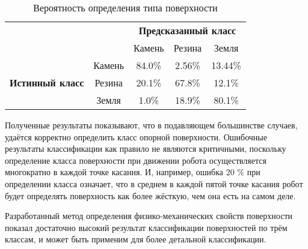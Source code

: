 \begin{table}[H]
    \caption{Вероятность определения типа поверхности}
    \label{tabular:prob_terrain_classification}
    \centering
\begin{tabular}{|c|c|c|c|c|} 
    \cline{3-5}
    \multicolumn{1}{l}{} & \multicolumn{1}{l|}{} & \multicolumn{3}{c|}{\textbf{Предсказанный класс}} \\ 
    \cline{3-5}
    \multicolumn{1}{l}{} &  & Камень & Резина & Земля \\ 
    \hline
    \multirow{3}{*}{{\textbf{Истинный класс}}} & Камень & {\cellcolor[rgb]{0.741,0.843,0.929}}84.0\% & 2.56\% & 13.44\% \\ 
    \hhline{|~----|}
     & Резина & 20.1\% & {\cellcolor[rgb]{0.741,0.843,0.929}}67.8\% & 12.1\% \\ 
    \hhline{|~----|}
     & Земля & 1.0\% & 18.9\% & {\cellcolor[rgb]{0.741,0.843,0.929}}80.1\% \\
    \hline
    \end{tabular}
\end{table}

Полученные результаты показывают, что в подавляющем большинстве случаев, удаётся корректно определить класс опорной поверхности. Ошибочные результаты классификации как правило не являются критичными, поскольку определение класса поверхности при движении робота осуществляется многократно в каждой точке касания. И, например, ошибка 20 \% при определении класса означает, что в среднем в каждой пятой точке касания робот будет определять поверхность как более жёсткую, чем она есть на самом деле.

Разработанный метод определения физико-механических свойств поверхности показал достаточно высокий результат классификации поверхностей по трём классам, и может быть применим для более детальной классификации.